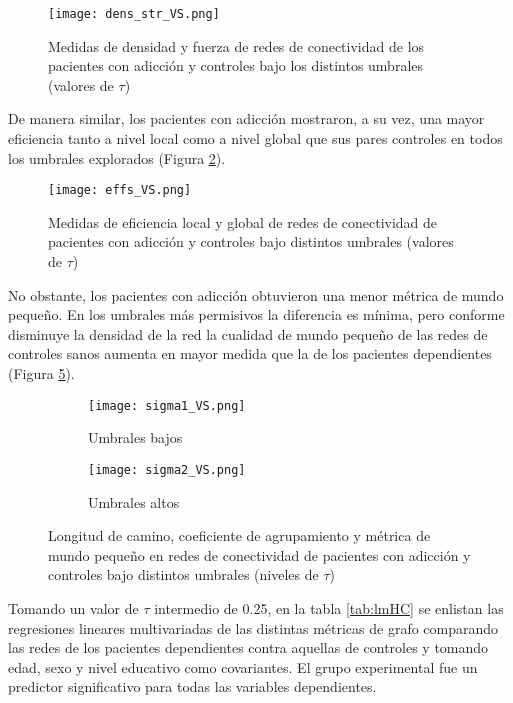 \begin{figure}[!ht]
    \centering
    \texttt{[image: dens\_str\_VS.png]}
    \caption{Medidas de densidad y fuerza de redes de conectividad  de los pacientes con adicción y controles bajo los distintos umbrales (valores de $\tau$)}
    \label{fig:dsHC}
\end{figure}

De manera similar, los pacientes con adicción mostraron, a su vez, una mayor eficiencia tanto a nivel local como a nivel global que sus pares controles en todos los umbrales explorados (Figura \ref{fig:effHC}).

\begin{figure}[!ht]
    \centering
    \texttt{[image: effs\_VS.png]}
    \caption{Medidas de eficiencia local y global de redes de conectividad de pacientes con adicción y controles bajo distintos umbrales (valores de $\tau$)}
    \label{fig:effHC}
\end{figure}

No obstante, los pacientes con adicción obtuvieron una menor métrica de mundo pequeño.
En los umbrales más permisivos la diferencia es mínima, pero conforme disminuye la densidad de la red la cualidad de mundo pequeño de las redes de controles sanos aumenta en mayor medida que la de los pacientes dependientes (Figura \ref{fig:sigmaHC}).

\begin{figure}[!ht]
    \centering
    \begin{subfigure}[t]{0.8\textwidth}
        \centering
        \texttt{[image: sigma1\_VS.png]}
        \caption{Umbrales bajos}
        \label{fig:sigma1}
    \end{subfigure}
    \begin{subfigure}[t]{0.8\textwidth}
        \centering
        \texttt{[image: sigma2\_VS.png]}
        \caption{Umbrales altos}
        \label{fig:sigma2}
    \end{subfigure}
    \caption{Longitud de camino, coeficiente de agrupamiento y métrica de mundo pequeño en redes de conectividad de pacientes con adicción y controles bajo distintos umbrales (niveles de $\tau$)}
    \label{fig:sigmaHC}
\end{figure}

Tomando un valor de $\tau$ intermedio de 0.25, en la tabla \ref{tab:lmHC} se enlistan las regresiones lineares multivariadas de las distintas métricas de grafo comparando las redes de los pacientes dependientes contra aquellas de controles y tomando edad, sexo y nivel educativo como covariantes. El grupo experimental fue un predictor significativo para todas las variables dependientes.

